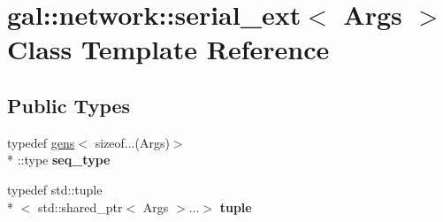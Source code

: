 \hypertarget{classgal_1_1network_1_1serial__ext}{\section{gal\-:\-:network\-:\-:serial\-\_\-ext$<$ Args $>$ Class Template Reference}
\label{classgal_1_1network_1_1serial__ext}
}
\subsection*{Public Types}
\begin{DoxyCompactItemize}
\item 
\hypertarget{classgal_1_1network_1_1serial__ext_a67ab3df55041b1a29a039223d45575f4}{typedef \hyperlink{structgens}{gens}$<$ sizeof...(Args)$>$\\*
\-::type {\bfseries seq\-\_\-type}}\label{classgal_1_1network_1_1serial__ext_a67ab3df55041b1a29a039223d45575f4}

\item 
\hypertarget{classgal_1_1network_1_1serial__ext_a41bae0b2f8a46739862abc99ef1a135e}{typedef std\-::tuple\\*
$<$ std\-::shared\-\_\-ptr$<$ Args $>$...$>$ {\bfseries tuple}}\label{classgal_1_1network_1_1serial__ext_a41bae0b2f8a46739862abc99ef1a135e}

\end{DoxyCompactItemize}
